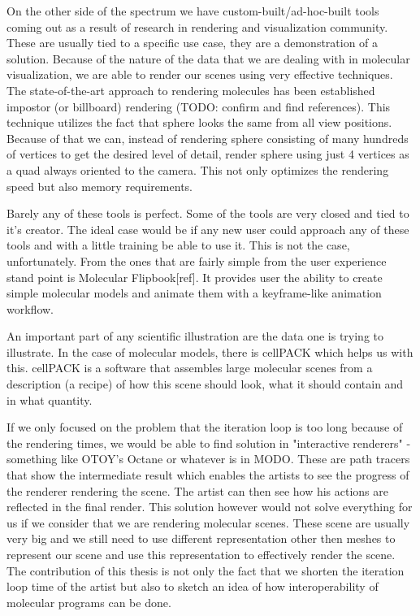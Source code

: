 \documentclass[
  digital, %
  table,   %
  lof,     %
  lot,     %
]{fithesis3}
\begin{document}
On the other side of the spectrum we have custom-built/ad-hoc-built tools coming out as a result of research in rendering and visualization community. These are usually tied to a specific use case, they are a demonstration of a solution. Because of the nature of the data that we are dealing with in molecular visualization, we are able to render our scenes using very effective techniques. The state-of-the-art approach to rendering molecules has been established impostor (or billboard) rendering (TODO: confirm and find references). This technique utilizes the fact that sphere looks the same from all view positions. Because of that we can, instead of rendering sphere consisting of many hundreds of vertices to get the desired level of detail, render sphere using just 4 vertices as a quad always oriented to the camera. This not only optimizes the rendering speed but also memory requirements.

Barely any of these tools is perfect. Some of the tools are very closed and tied to it's creator. The ideal case would be if any new user could approach any of these tools and with a little training be able to use it. This is not the case, unfortunately.
From the ones that are fairly simple from the user experience stand point is Molecular Flipbook[ref]. It provides user the ability to create simple molecular models and animate them with a keyframe-like animation workflow. 

An important part of any scientific illustration are the data one is trying to illustrate. In the case of molecular models, there is cellPACK which helps us with this. cellPACK is a software that assembles large molecular scenes from a description (a recipe) of how this scene should look, what it should contain and in what quantity.

If we only focused on the problem that the iteration loop is too long because of the rendering times, we would be able to find solution in "interactive renderers" - something like OTOY's Octane or whatever is in MODO. These are path tracers that show the intermediate result which enables the artists to see the progress of the renderer rendering the scene. The artist can then see how his actions are reflected in the final render. This solution however would not solve everything for us if we consider that we are rendering molecular scenes. These scene are usually very big and we still need to use different representation other then meshes to represent our scene and use this representation to effectively render the scene. The contribution of this thesis is not only the fact that we shorten the iteration loop time of the artist but also to sketch an idea of how interoperability of molecular programs can be done.
\end{document}
